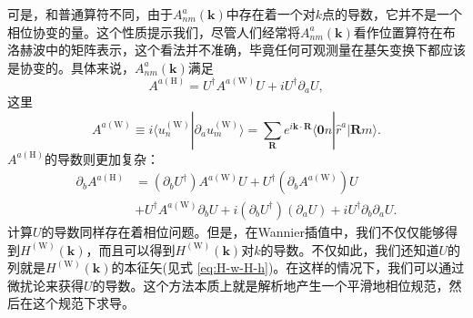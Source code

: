 可是，和普通算符不同，由于$A_{nm}^{a}(\mathbf{k})$中存在着一个对$k$点的导数，它并不是一个相位协变的量。这个性质提示我们，尽管人们经常将$A_{nm}^{a}(\mathbf{k})$看作位置算符在布洛赫波中的矩阵表示，这个看法并不准确，毕竟任何可观测量在基矢变换下都应该是协变的。具体来说，$A_{nm}^{a}(\mathbf{k})$满足\cite{wang_textitab_2006} 
\begin{equation}
A^{a(\textrm{H})}=U^{\dagger}A^{a(\textrm{W})}U+iU^{\dagger}\partial_{a}U,\label{eq:A-H-A-W}
\end{equation}
这里
\begin{equation}
A^{a(\textrm{W})}\equiv i\langle u_{n}^{(\textrm{W})}|\partial_{a}u_{m}^{(\textrm{W})}\rangle=\sum_{\mathbf{R}}e^{i\mathbf{k}\cdot\mathbf{R}}\langle\mathbf{0}n|\hat{r}^{a}|\mathbf{R}m\rangle.
\end{equation}
$A^{a(\textrm{H})}$的导数则更加复杂：
\begin{align}
\partial_{b}A^{a(\textrm{H})} & =(\partial_{b}U^{\dagger})A^{a(\textrm{W})}U+U^{\dagger}(\partial_{b}A^{a(\textrm{W})})U\\
& +U^{\dagger}A^{a(\textrm{W})}\partial_{b}U+i(\partial_{b}U^{\dagger})(\partial_{a}U)+iU^{\dagger}\partial_{b}\partial_{a}U.
\end{align}
计算$U$的导数同样存在着相位问题。但是，在Wannier插值中，我们不仅仅能够得到$H^{(\textrm{W})}(\mathbf{k})$，而且可以得到$H^{(\textrm{W})}(\mathbf{k})$对$k$的导数。不仅如此，我们还知道$U$的列就是$H^{(\textrm{W})}(\mathbf{k})$的本征矢(见式 \ref{eq:H-w-H-h})。在这样的情况下，我们可以通过微扰论来获得$U$的导数。这个方法本质上就是解析地产生一个平滑地相位规范，然后在这个规范下求导。

